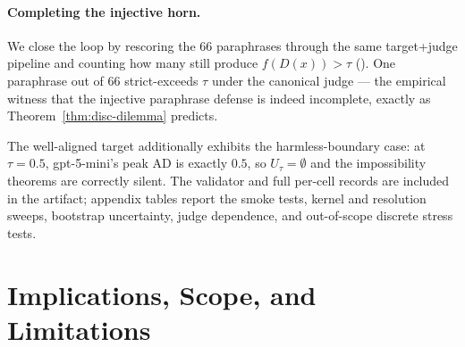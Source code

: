 \documentclass[11pt]{article}
\begin{document}
\begin{table}[h]
\centering
\small
\caption{Forced-collapse demonstration of~
on the $66$ unsafe prompts of the saturated
\texttt{gpt-3.5-turbo-0125} archive.
The ``refusal'' and ``canonical-category'' defenses are complete by
construction and therefore must be non-injective; they collapse $66$
inputs to $1$ and $7$ distinct outputs respectively.
The paraphrase defense is injective on this sample (all $66$ outputs
distinct) and therefore, by~, must fail to be
complete on at least one prompt.}
\label{tab:forced-collapse}

\end{table}

\paragraph{Completing the injective horn.}
We close the loop by rescoring the $66$ paraphrases through the same
target+judge pipeline and counting how many still produce
$f(D(x))>\tau$ (). One paraphrase out of
$66$ strict-exceeds $\tau$ under the canonical judge --- the
empirical witness that the injective paraphrase defense is indeed
incomplete, exactly as Theorem~\ref{thm:disc-dilemma} predicts.

\begin{table}[h]
\centering
\small
\caption{Paraphrase defense is injective on the $66$ unsafe prompts
(Table~\ref{tab:forced-collapse}), so Theorem~\ref{thm:disc-dilemma}
requires it to be incomplete. Rescoring confirms exactly one strict
false negative out of $66$.}
\label{tab:paraphrase-unsafe}

\end{table}

The well-aligned target additionally exhibits the harmless-boundary
case: at $\tau = 0.5$, gpt-5-mini's peak AD is exactly $0.5$, so
$U_\tau = \emptyset$ and the impossibility theorems are correctly
silent. The validator and full per-cell records are included in the
artifact; appendix tables report the smoke tests, kernel and
resolution sweeps, bootstrap uncertainty, judge dependence, and
out-of-scope discrete stress tests.


\section{Implications, Scope, and Limitations}
\label{sec:engineering}
\end{document}
